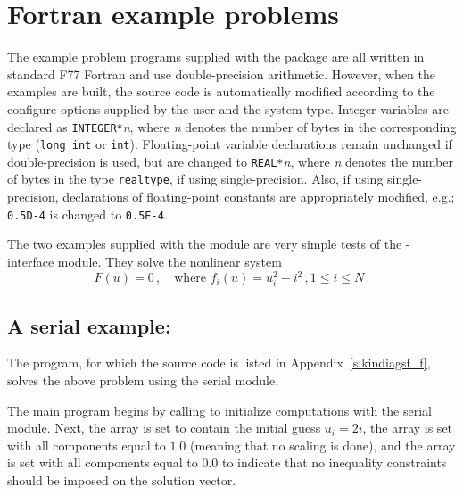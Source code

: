 \section{Fortran example problems}\label{s:ex_fortran}

The {\F} example problem programs supplied with the {\kinsol}
package are all written in standard F77 Fortran and use double-precision
arithmetic. However, when the {\F} examples are built, the source code is
automatically modified according to the configure options supplied by the
user and the system type. Integer variables are declared as {\tt INTEGER*}{\em n},
where {\em n} denotes the number of bytes in the corresponding {\C} type
({\tt long int} or {\tt int}). Floating-point variable declarations remain
unchanged if double-precision is used, but are changed to {\tt REAL*}{\em n},
where {\em n} denotes the number of bytes in the {\sundials} type {\tt realtype},
if using single-precision. Also, if using single-precision, declarations of
floating-point constants are appropriately modified, e.g.; {\tt 0.5D-4} is
changed to {\tt 0.5E-4}.


The two examples supplied with the {\fkinsol} module are very simple tests 
of the {\F}-{\C} interface module. 
They solve the nonlinear system
\begin{equation*}
  F(u) = 0 \, , \quad \text{where } f_i(u) = u_i^2 - i^2 \, , 1 \le i \le N \, . 
\end{equation*}

\subsection{A serial example: }\label{ss:kindiagsf}

The  program, for which the source code is listed in
Appendix~\ref{s:kindiagsf_f}, solves the above problem using the serial
{\nvecs} module.

The main program begins by calling  to initialize computations
with the serial {\nvecs} module. Next, the array  is set to contain
the initial guess $u_i = 2 i$, the array  is set with all 
components equal to $1.0$ (meaning that no scaling is done), and the array
 is set with all components equal to $0.0$ to indicate that no 
inequality constraints should be imposed on the solution vector.

